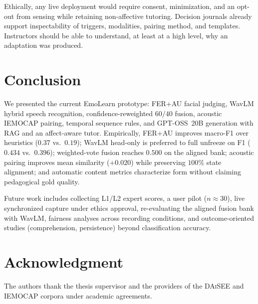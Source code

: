 \documentclass[conference]{IEEEtran}
\begin{document}
Ethically, any live deployment would require consent, minimization, and an
opt-out from sensing while retaining non-affective tutoring. Decision journals
already support inspectability of triggers, modalities, pairing method, and
templates. Instructors should be able to understand, at least at a high level,
why an adaptation was produced.

\section{Conclusion}
\label{sec:conclusion}

We presented the current EmoLearn prototype: FER+AU facial judging, WavLM
hybrid speech recognition, confidence-reweighted $60/40$ fusion, acoustic
IEMOCAP pairing, temporal sequence rules, and GPT-OSS~20B generation with RAG
and an affect-aware tutor. Empirically, FER+AU improves macro-F1 over
heuristics ($0.37$ vs.\ $0.19$); WavLM head-only is preferred to full unfreeze
on F1 ($0.434$ vs.\ $0.396$); weighted-vote fusion reaches $0.500$ on the
aligned bank; acoustic pairing improves mean similarity ($+0.020$) while
preserving $100\%$ state alignment; and automatic content metrics characterize
form without claiming pedagogical gold quality.

Future work includes collecting L1/L2 expert scores, a user pilot
($n{\approx}30$), live synchronized capture under ethics approval, re-evaluating
the aligned fusion bank with WavLM, fairness analyses across recording
conditions, and outcome-oriented studies (comprehension, persistence) beyond
classification accuracy.

\section*{Acknowledgment}
The authors thank the thesis supervisor and the providers of the \textsc{DAiSEE}
and \textsc{IEMOCAP} corpora under academic agreements.



\balance
\end{document}
